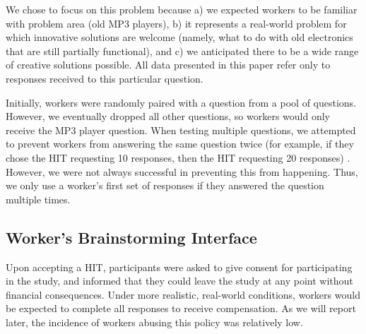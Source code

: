 
We chose to focus on this problem because a) we expected workers to be familiar with problem area (old MP3 players), b) it represents a real-world problem for which innovative solutions are welcome (namely, what to do with old electronics that are still partially functional), and c) we anticipated there to be a wide range of creative solutions possible. All data presented in this paper refer only to responses received to this particular question.

Initially, workers were randomly paired with a question from a pool of questions. However, we eventually dropped all other questions, so workers would only receive the MP3 player question. When testing multiple questions, we attempted to prevent workers from answering the same question twice (for example, if they chose the HIT requesting 10 responses, then the HIT requesting 20 responses) . However, we were not always successful in preventing this from happening. Thus, we only use a worker's first set of responses if they answered the question multiple times.


\subsection{Worker's Brainstorming Interface}

Upon accepting a HIT, participants were asked to give consent for participating in the study, and informed that they could leave the study at any point without financial consequences. Under more realistic, real-world conditions, workers would be expected to complete all responses to receive compensation. As we will report later, the incidence of workers abusing this policy was relatively low.

